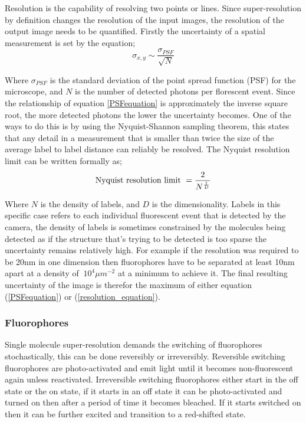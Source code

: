 \documentclass[aps,pra,a4paper,nofootinbib,onecolumn,tightenlines,longbibliography,12pt,amsfonts,amssymb,amsmath,floatfix]{revtex4-2} %
\begin{document}
   Resolution is the capability of resolving two points or lines.
   Since super-resolution by definition changes the resolution of the input images, 
   the resolution of the output image needs to be quantified.
   Firstly the uncertainty of a spatial measurement is set by the equation;
   \begin{equation}\label{PSFequation}
   \sigma_{x,y}\sim\frac{\sigma_{PSF}}{\sqrt{N}}
   \end{equation}

   Where $\sigma_{PSF}$ is the standard deviation of the point spread function (PSF)
   for the microscope, and $N$ is the number of detected photons per florescent event.
   Since the relationship of equation \ref{PSFequation} is approximately the inverse square root, 
   the more detected photons the lower the uncertainty becomes.\cite{DEMPSEY2013561}
   One of the ways to do this is by using the Nyquist-Shannon sampling theorem,
   this states that any detail in a measurement that is smaller than twice the size of the 
   average label to label distance can reliably be resolved.\cite{tinnefeld2015far}
   The Nyquist resolution limit can be written formally as; 
   \begin{equation}\label{resolution_equation}
     \textrm{Nyquist resolution limit} \/\ =\frac{2}{N^{\frac{1}{D}}}
   \end{equation}

   Where $N$ is the density of labels, and $D$ is the dimensionality. 
   Labels in this specific case refers to each individual fluorescent event that is 
   detected by the camera, the density of labels is sometimes constrained by the 
   molecules being detected as if the structure that's trying to be detected is too
   sparse the uncertainty remains relatively high. 
   For example if the resolution was required to be 20nm in 
   one dimension then fluorophores have to be separated at least 10nm apart at a density of 
   $~10^4\mu m^{-2}$ at a minimum to achieve it.
   The final resulting uncertainty of the image is therefor the maximum of either equation (\ref{PSFequation}) or (\ref{resolution_equation}). 


   \subsubsection{Fluorophores} %
   \label{ssub:Fluorophores}
   
   Single molecule super-resolution demands the switching of fluorophores
   stochastically, this can be done reversibly or irreversibly. Reversible switching fluorophores
   are photo-activated and emit light until it becomes non-fluorescent again unless reactivated.  
   Irreversible switching fluorophores either start in the off state or the on state, if it 
   starts in an off state it can be photo-activated and turned on then after a period of 
   time it becomes bleached. If it starts switched on then it can be further excited 
   and transition to a red-shifted state.\cite{van2011single}
\end{document}
